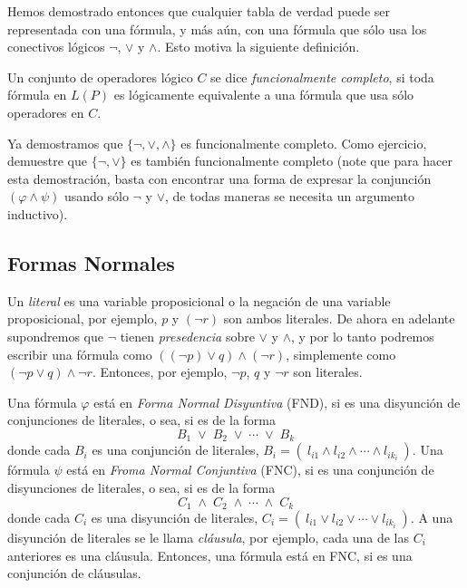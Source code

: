 Hemos demostrado entonces que cualquier tabla de verdad puede ser representada con una f\'ormula,
y m\'as a\'un, con una f\'ormula que s\'olo usa los conectivos l\'ogicos $\neg$, $\vee$ y $\wedge$.
Esto motiva la siguiente definici\'on.

\begin{definicion}
Un conjunto de operadores l\'ogico $C$ se dice {\em funcionalmente completo},
si toda f\'ormula en $L(P)$ es l\'ogicamente equivalente a una f\'ormula que usa s\'olo operadores
en $C$.
\end{definicion}

Ya demostramos que $\{\neg,\vee,\wedge\}$ es funcionalmente completo. 
Como ejercicio, demuestre que $\{\neg, \vee\}$ es tambi\'en funcionalmente
completo (note que para hacer esta demostraci\'on, basta con encontrar una forma de expresar
la conjunci\'on $(\varphi \wedge \psi)$ usando s\'olo $\neg$ y $\vee$, de todas maneras se necesita un
argumento inductivo).

\subsection{Formas Normales}

Un {\em literal} es una variable proposicional o la negaci\'on de una variable proposicional, por ejemplo,
$p$ y $(\neg r)$ son ambos literales. 
De ahora en adelante supondremos que $\neg$ tienen {\em presedencia} sobre $\vee$ y $\wedge$, y por lo tanto
podremos escribir una f\'ormula como $((\neg p) \vee q) \wedge (\neg r)$, simplemente como $(\neg p \vee q) \wedge \neg r$.
Entonces, por ejemplo, $\neg p$, $q$ y $\neg r$ son literales.

\begin{definicion}
Una f\'ormula $\varphi$ est\'a en {\em Forma Normal Disyuntiva} (FND), si es una disyunci\'on de conjunciones de literales,
o sea, si es de la forma
\[
B_1 \; \vee \; B_2\;  \vee\; \cdots\; \vee\; B_k
\]
donde cada $B_i$ es una conjunci\'on de literales, $B_i=(\ l_{i1} \wedge l_{i2} \wedge \cdots \wedge l_{ik_i}\ )$.
Una f\'ormula $\psi$ est\'a en {\em Froma Normal Conjuntiva} (FNC), si es una conjunci\'on de disyunciones de literales,
o sea, si es de la forma
\[
C_1 \; \wedge \; C_2\;  \wedge \; \cdots\; \wedge \; C_k
\]
donde cada $C_i$ es una disyunci\'on de literales, $C_i=(\ l_{i1} \vee l_{i2} \vee \cdots \vee l_{ik_i}\ )$.
A una disyunci\'on de literales se le llama {\em cl\'ausula}, por ejemplo, cada una de las $C_i$ anteriores
es una cl\'ausula.
Entonces, una f\'ormula est\'a en FNC, si es una conjunci\'on de cl\'ausulas.
\end{definicion}

